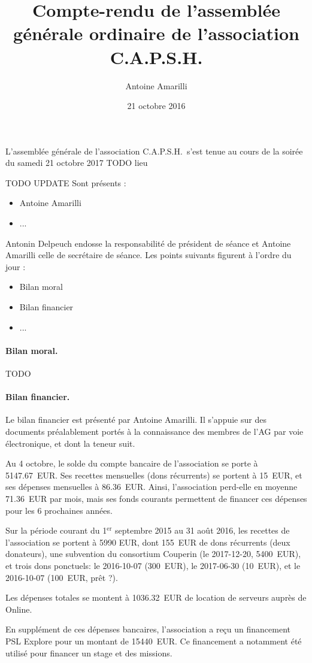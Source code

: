 \documentclass{scrartcl}
\title{Compte-rendu de l'assemblée générale ordinaire de l'association C.A.P.S.H.}
\author{Antoine Amarilli}
\date{21 octobre 2016}
\begin{document}
\maketitle

L'assemblée générale de l'association C.A.P.S.H.\ s'est tenue au cours de la
soirée du samedi 21 octobre 2017 TODO lieu

TODO UPDATE
% 
Sont présents :

\medskip

\begin{itemize}
\item Antoine Amarilli
\item ...
\end{itemize}

\medskip

Antonin Delpeuch endosse la responsabilité de président de séance et Antoine
Amarilli celle de secrétaire de séance. Les points suivants figurent à l'ordre
du jour :

\medskip

\begin{itemize}
\item Bilan moral
\item Bilan financier
\item ...
\end{itemize}

\paragraph{Bilan moral.} TODO

\paragraph{Bilan financier.} Le bilan financier est présenté par Antoine
Amarilli. Il s'appuie sur des documents préalablement portés à la connaissance des
membres de l'AG par voie électronique, et dont la teneur suit.

Au 4 octobre, le solde du compte bancaire de l'association se porte à 5147.67~EUR. 
Ses recettes mensuelles (dons récurrents) se portent à 15~EUR, et ses dépenses
mensuelles à 86.36~EUR. Ainsi, l'association perd-elle en moyenne 71.36~EUR par
mois, mais ses fonds courants permettent de financer ces dépenses pour les 6
prochaines années.

Sur la période courant du 1$^{\mathrm{er}}$ septembre 2015 au 31 août 2016, les
recettes de l'association se portent à 5990 EUR, dont 155~EUR de dons récurrents
(deux donateurs), une subvention du consortium Couperin (le 2017-12-20,
5400~EUR), et trois dons ponctuels: le 2016-10-07 (300~EUR),
le 2017-06-30 (10~EUR), et le 2016-10-07 (100~EUR, prêt ?).

Les dépenses totales se montent à 1036.32~EUR de location de serveurs auprès de
Online.

En supplément de ces dépenses bancaires, l'association a reçu un financement PSL
Explore pour un montant de 15440~EUR. Ce financement a notamment été utilisé
pour financer un stage et des missions.

\bigskip

\end{document}
